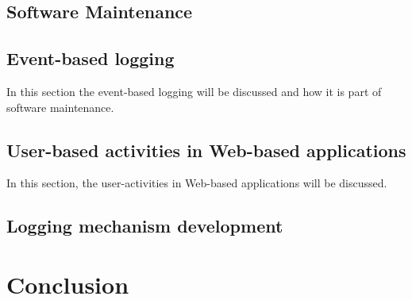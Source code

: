 \subsection{Software Maintenance}

\subsection{Event-based logging}
In this section the event-based logging will be discussed and how it is part of software maintenance. 

\subsection{User-based activities in Web-based applications}
In this section, the user-activities in Web-based applications will be discussed.

\subsection{Logging mechanism development}

\section{Conclusion}

